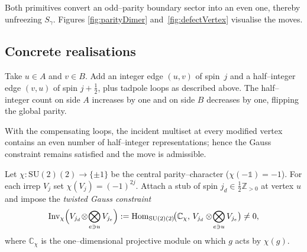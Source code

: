 \documentclass[11pt]{article}
\newcommand{\SU}{\mathrm{SU}(2)}
\newcommand{\Inv}{\mathrm{Inv}}
\newcommand{\Cut}{\gamma}
\begin{document}
Both primitives convert an odd–parity boundary sector into an even one,
thereby unfreezing $S_\Cut$.  Figures \ref{fig:parityDimer}
and~\ref{fig:defectVertex} visualise the moves.

\subsection*{Concrete realisations}

\begin{example}\label{ex:paritydimer}
Take $u\in A$ and $v\in B$.  Add an integer edge $(u,v)$ of spin~$j$ and a
half–integer edge $(v,u)$ of spin $j+\tfrac12$, plus tadpole loops as
described above.  The half–integer count on side $A$ increases by one and
on side $B$ decreases by one, flipping the global parity.
\end{example}

\begin{lemma}\label{lem:dimerGauge}
With the compensating loops, the incident multiset at every modified
vertex contains an even number of half–integer representations; hence
the Gauss constraint remains satisfied and the move is admissible.
\end{lemma}

\begin{definition}\label{def:defectAdmissible}
Let \(\chi:\SU(2)\!\to\!\{\pm1\}\) be the central parity–character
(\(\chi(-\mathbb1)=-1\)).  
For each irrep \(V_j\) set \(\chi(V_j)=(-1)^{2j}\).
Attach a stub of spin \(j_d\in\tfrac12\mathbb Z_{>0}\) at vertex \(u\) and
impose the \emph{twisted Gauss constraint}
\[
  \Inv_{\chi}\Bigl(
     V_{j_d}\!\otimes\!\bigotimes_{e\ni u} V_{j_e}
  \Bigr)
  :=\operatorname{Hom}_{\SU(2)}\!\bigl(
       \mathbb C_{\chi},\,
       V_{j_d}\otimes\!\bigotimes_{e\ni u} V_{j_e}
     \bigr)\neq0,
\]
where \(\mathbb C_{\chi}\) is the one–dimensional projective module on
which \(g\) acts by \(\chi(g)\).
\end{definition}
\end{document}
